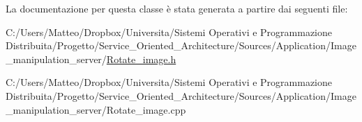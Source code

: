La documentazione per questa classe è stata generata a partire dai seguenti file\-:\begin{DoxyCompactItemize}
\item 
C\-:/\-Users/\-Matteo/\-Dropbox/\-Universita/\-Sistemi Operativi e Programmazione Distribuita/\-Progetto/\-Service\-\_\-\-Oriented\-\_\-\-Architecture/\-Sources/\-Application/\-Image\-\_\-manipulation\-\_\-server/\hyperlink{_rotate__image_8h}{Rotate\-\_\-image.\-h}\item 
C\-:/\-Users/\-Matteo/\-Dropbox/\-Universita/\-Sistemi Operativi e Programmazione Distribuita/\-Progetto/\-Service\-\_\-\-Oriented\-\_\-\-Architecture/\-Sources/\-Application/\-Image\-\_\-manipulation\-\_\-server/Rotate\-\_\-image.\-cpp\end{DoxyCompactItemize}
